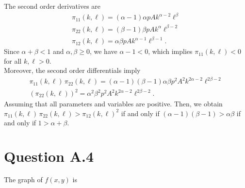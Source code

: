 \documentclass[letterpaper,10pt,english]{jupyterBook}
\begin{document}
\begin{enumerate}
\begin{enumerate}
\end{enumerate}

\sphinxAtStartPar
The second order derivatives are
\begin{equation*}
\begin{split}
   \pi_{11}(k,\ell) = (\alpha-1)\alpha pA k^{\alpha-2} \ell^\beta \\
   \pi_{22}(k,\ell) = (\beta-1)\beta pA k^{\alpha} \ell^{\beta-2}\\
   \pi_{12}(k, \ell) = \alpha \beta pA k^{\alpha-1} \ell^{\beta-1}.
   \end{split}
\end{equation*}
\sphinxAtStartPar
Since \(\alpha+\beta<1\) and \(\alpha, \beta \geq 0\), we have \(\alpha-1<0\), which implies \(\pi_{11}(k,\ell)<0\) for all \(k, \ell >0\).\\
Moreover, the second order differentials imply
\begin{equation*}
\begin{split}
   \pi_{11}(k, \ell) \, \pi_{22}(k, \ell) = (\alpha-1)(\beta-1)\alpha \beta p^2 A^2 k^{2\alpha-2} \ell^{2\beta-2}\\
   (\pi_{22}(k, \ell))^2 = \alpha^2 \beta^2 p^2 A^2 k^{2\alpha-2} \ell^{2\beta-2}.
   \end{split}
\end{equation*}
\sphinxAtStartPar
Assuming that all parameters and variables are positive.
Then, we obtain \(\pi_{11}(k, \ell) \, \pi_{22}(k, \ell) >  \pi_{12}(k, \ell)^2\) if and only if \((\alpha-1)(\beta-1) > \alpha \beta\) if and only if \(1 > \alpha + \beta\).

\end{enumerate}


\section{Question A.4}
\label{\detokenize{02.exercises_solutions:question-a-4}}
\sphinxAtStartPar
The graph of \(f(x,y)\) is
\end{document}
